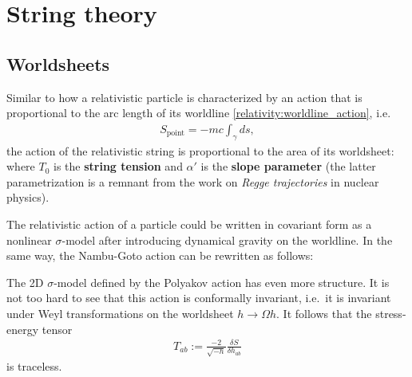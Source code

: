 \section{String theory}
\subsection{Worldsheets}

    Similar to how a relativistic particle is characterized by an action that is proportional to the arc length of its worldline \eqref{relativity:worldline_action}, i.e.
    \begin{gather}
        S_\mathrm{point}=-mc\int_\gamma ds,
    \end{gather}
    the action of the relativistic string is proportional to the area of its worldsheet:
    where $T_0$ is the \textbf{string tension} and $\alpha'$ is the \textbf{slope parameter} (the latter parametrization is a remnant from the work on \textit{Regge trajectories} in nuclear physics).

    The relativistic action of a particle could be written in covariant form as a nonlinear $\sigma$-model after introducing dynamical gravity on the worldline. In the same way, the Nambu-Goto action can be rewritten as follows:

    \begin{property}
        The 2D $\sigma$-model defined by the Polyakov action has even more structure. It is not too hard to see that this action is conformally invariant, i.e.~it is invariant under Weyl transformations on the worldsheet $h\longrightarrow\Omega h$. It follows that the stress-energy tensor
        \begin{gather}
            T_{ab} := \frac{-2}{\sqrt{-h}}\frac{\delta S}{\delta h_{ab}}
        \end{gather}
        is traceless.
    \end{property}

